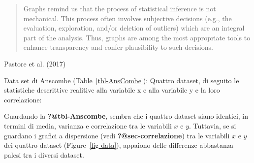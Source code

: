 \documentclass[
  a4paper,
  DIV=11,
  numbers=noendperiod]{scrreprt}
\begin{document}
\begin{quote}
\large
Graphs remind us that the process of statistical inference is
not mechanical. This process often involves subjective decisions (e.g., the
evaluation, exploration, and/or deletion of outliers) which are an
integral part of the analysis. Thus, graphs are among the most
appropriate tools to enhance transparency and confer plausibility
to such decisions.
\end{quote}

\vspace{10mm}
\begin{flushright}
Pastore et al. (2017)
\end{flushright}

Data set di Anscombe (Table~\ref{tbl-AnsCombe}): Quattro dataset, di
seguito le statistiche descrittive realitive alla variabile x e alla
variabile y e la loro correlazione:

\begin{table}

\caption{\label{tbl-AnsCombe}Dataset di Anscombe}


\end{table}%

Guardando la \textbf{?@tbl-Anscombe}, sembra che i quattro dataset siano
identici, in termini di media, varianza e correlazione tra le variabili
\(x\) e \(y\). Tuttavia, se si guardano i grafici a dispersione (vedi
\textbf{?@sec-correlazione}) tra le variabili \(x\) e \(y\) dei quattro
dataset (Figure~\ref{fig-data}), appaiono delle differenze abbastanza
palesi tra i diversi dataset.
\end{document}
